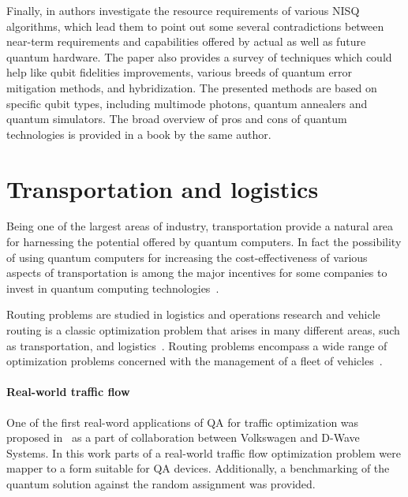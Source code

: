 \documentclass[a4paper,11pt]{article}
\begin{document}
Finally, in \cite{ezratty2023where} authors investigate the resource requirements of various NISQ algorithms, which lead them to point out some several contradictions between near-term requirements and capabilities offered by actual as well as future quantum hardware. The paper also provides a survey of techniques which could help like qubit fidelities improvements, various breeds of quantum error mitigation methods, and hybridization. The presented methods are based on specific qubit types, including multimode photons, quantum annealers and quantum simulators. The broad overview of pros and cons of quantum technologies is provided in a book \cite{ezratty2021understanding} by the same author.



\section{Transportation and logistics}

Being one of the largest areas of industry, transportation provide a natural area for harnessing the potential offered by quantum computers. In fact the possibility of using quantum computers for increasing the cost-effectiveness of various aspects of transportation is among the major incentives for some companies to invest in quantum computing technologies~\cite{bentley2022quantum, cooper2022exploring}.


Routing problems are studied in logistics and operations research and 
vehicle routing is a classic optimization problem that arises in many different areas, such as transportation, and logistics~\cite{dantzig1959truck,toth2002vehicle}. Routing problems encompass a wide range of optimization problems concerned with the management of a fleet of vehicles~\cite{harwood2021formulating}. 

\paragraph{Real-world traffic flow} One of the first real-word applications of QA for traffic optimization was proposed in~\cite{neukart2017traffic} as a part of collaboration between Volkswagen and D-Wave Systems. In this work parts of a real-world traffic flow optimization problem were mapper to a form suitable for QA devices. Additionally, a benchmarking of the quantum solution against the random assignment was provided.
\end{document}
